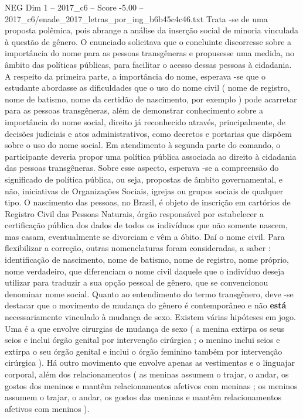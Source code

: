 \begin{textsample}{NEG Dim 1 – 2017\_c6 – Score -5.00 – 2017\_c6/enade\_2017\_letras\_por\_ing\_b6b45c4c46.txt}
Trata -se de uma proposta polêmica, pois abrange a análise da inserção social de minoria vinculada à questão de gênero.
O enunciado solicitava que o concluinte discorresse sobre a importância do nome para as pessoas transgêneras e propusesse uma medida, no âmbito das políticas públicas, para facilitar o acesso dessas pessoas à cidadania.
A respeito da primeira parte, a importância do nome, esperava -se que o estudante abordasse as dificuldades que o uso do nome civil ( nome de registro, nome de batismo, nome da certidão de nascimento, por exemplo ) pode acarretar para as pessoas transgêneras, além de demonstrar conhecimento sobre a importância do nome social, direito já reconhecido através, principalmente, de decisões judiciais e atos administrativos, como decretos e portarias que dispõem sobre o uso do nome social.
Em atendimento à segunda parte do comando, o participante deveria propor uma política pública associada ao direito à cidadania das pessoas transgêneras.
Sobre esse aspecto, esperava -se a compreensão do significado de política pública, ou seja, propostas de âmbito governamental, e não, iniciativas de Organizações Sociais, igrejas ou grupos sociais de qualquer tipo.
O nascimento das pessoas, no Brasil, é objeto de inscrição em cartórios de Registro Civil das Pessoas Naturais, órgão responsável por estabelecer a certificação pública dos dados de todos os indivíduos que não somente nascem, mas casam, eventualmente se divorciam e vêm a óbito.
Daí o nome civil.
Para flexibilizar a correção, outras nomenclaturas foram consideradas, a saber : identificação de nascimento, nome de batismo, nome de registro, nome próprio, nome verdadeiro, que diferenciam o nome civil daquele que o indivíduo deseja utilizar para traduzir a sua opção pessoal de gênero, que se convencionou denominar nome social.
Quanto ao entendimento do termo transgênero, deve -se destacar que o movimento de mudança do gênero é contemporâneo e não \textbf{está} necessariamente vinculado à mudança de sexo.
Existem várias hipóteses em jogo.
Uma é a que envolve cirurgias de mudança de sexo ( a menina extirpa os seus seios e inclui órgão genital por intervenção cirúrgica ; o menino inclui seios e extirpa o seu órgão genital e inclui o órgão feminino também por intervenção cirúrgica ).
Há outro movimento que envolve apenas as vestimentas e o linguajar corporal, além dos relacionamentos ( as meninas assumem o trajar, o andar, os gostos dos meninos e mantêm relacionamentos afetivos com meninas ; os meninos assumem o trajar, o andar, os gostos das meninas e mantêm relacionamentos afetivos com meninos ).

\end{textsample}

